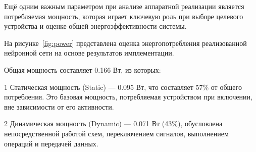
Ещё одним важным параметром при анализе аппаратной реализации является 
потребляемая мощность, которая играет ключевую роль при выборе целевого 
устройства и оценке общей энергоэффективности системы.

На рисунке~\ref{fig:power} представлена оценка энергопотребления 
реализованной нейронной сети на основе результатов имплементации.


Общая мощность составляет 0.166 Вт, из которых:

1 Статическая мощность (Static) — 0.095 Вт, что составляет 57\% от общего 
потребления. Это базовая мощность, потребляемая устройством при включении, вне 
зависимости от его активности.

2 Динамическая мощность (Dynamic) — 0.071 Вт (43\%), обусловлена 
непосредственной работой схем, переключением сигналов, выполнением операций и 
передачей данных.
